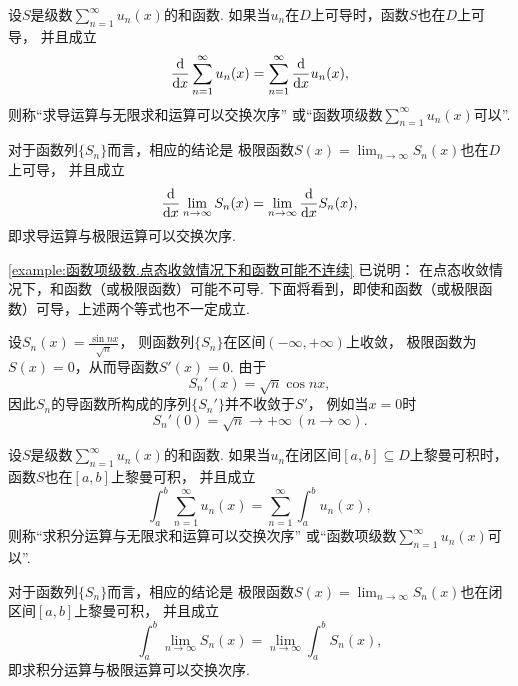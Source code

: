 \begin{definition}
设\(S\)是级数\(\sum_{n=1}^\infty u_n(x)\)的和函数.
如果当\(u_n\)在\(D\)上可导时，函数\(S\)也在\(D\)上可导，
并且成立\[
	\dv{x} \sum_{n=1}^\infty u_n(x)
	= \sum_{n=1}^\infty \dv{x} u_n(x),
\]
则称“求导运算与无限求和运算可以交换次序”
或“函数项级数\(\sum_{n=1}^\infty u_n(x)\)可以”.
\end{definition}
对于函数列\(\{S_n\}\)而言，相应的结论是
极限函数\(S(x) = \lim_{n\to\infty} S_n(x)\)也在\(D\)上可导，
并且成立\[
	\dv{x} \lim_{n\to\infty} S_n(x)
	= \lim_{n\to\infty} \dv{x} S_n(x),
\]
即求导运算与极限运算可以交换次序.

\cref{example:函数项级数.点态收敛情况下和函数可能不连续} 已说明：
在点态收敛情况下，和函数（或极限函数）可能不可导.
下面将看到，即使和函数（或极限函数）可导，上述两个等式也不一定成立.
\begin{example}
设\(S_n(x) = \frac{\sin nx}{\sqrt{n}}\)，
则函数列\(\{S_n\}\)在区间\((-\infty,+\infty)\)上收敛，
极限函数为\(S(x) = 0\)，从而导函数\(S'(x) = 0\).
由于\[
	S_n'(x) = \sqrt{n} \cos nx,
\]
因此\(S_n\)的导函数所构成的序列\(\{S_n'\}\)并不收敛于\(S'\)，
例如当\(x=0\)时\[
	S_n'(0) = \sqrt{n}\to+\infty\ (n\to\infty).
\]
\end{example}

\begin{definition}
设\(S\)是级数\(\sum_{n=1}^\infty u_n(x)\)的和函数.
如果当\(u_n\)在闭区间\([a,b] \subseteq D\)上黎曼可积时，函数\(S\)也在\([a,b]\)上黎曼可积，
并且成立\[
	\int_a^b \sum_{n=1}^\infty u_n(x)
	= \sum_{n=1}^\infty \int_a^b u_n(x),
\]
则称“求积分运算与无限求和运算可以交换次序”
或“函数项级数\(\sum_{n=1}^\infty u_n(x)\)可以”.
\end{definition}
对于函数列\(\{S_n\}\)而言，相应的结论是
极限函数\(S(x) = \lim_{n\to\infty} S_n(x)\)也在闭区间\([a,b]\)上黎曼可积，
并且成立\[
	\int_a^b \lim_{n\to\infty} S_n(x)
	= \lim_{n\to\infty} \int_a^b S_n(x),
\]
即求积分运算与极限运算可以交换次序.

